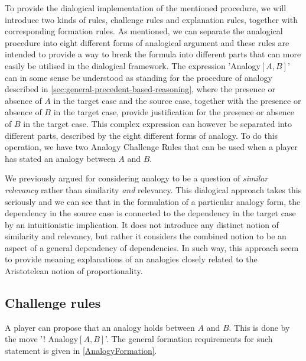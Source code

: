 		To provide the dialogical implementation of the mentioned procedure, we will introduce two kinds of rules, challenge rules and explanation rules, together with corresponding formation rules. As mentioned, we can separate the analogical procedure into eight different forms of analogical argument and these rules are intended to provide a way to break the formula into different parts that can more easily be utilised in the dialogical framework. The expression 'Analogy$[A,B]$' can in some sense be understood as standing for the procedure of analogy described in \autoref{sec:general-precedent-based-reasoning}, where the presence or absence of $A$ in the target case and the source case, together with the presence or absence of $B$ in the target case, provide justification for the presence or absence of $B$ in the target case. This complex expression can however be separated into different parts, described by the eight different forms of analogy. To do this operation, we have two Analogy Challenge Rules that can be used when a player has stated an analogy between $A$ and $B$.				
	
		We previously argued for considering analogy to be a question of \textit{similar relevancy} rather than similarity \textit{and} relevancy. This dialogical approach takes this seriously and we can see that in the formulation of a particular analogy form, the dependency in the source case is connected to the dependency in the target case by an intuitionistic implication. It does not introduce any distinct notion of similarity and relevancy, but rather it considers the combined notion to be an aspect of a general dependency of dependencies. In such way, this approach seem to provide meaning explanations of an analogies closely related to the Aristotelean notion of proportionality. 
	
	
		\subsection{Challenge rules}
		
		A player can propose that an analogy holds between $A$ and $B$. This is done by the move '! Analogy$[A,B]$'. The general formation requirements for such statement is given in \autoref{AnalogyFormation}.
		
